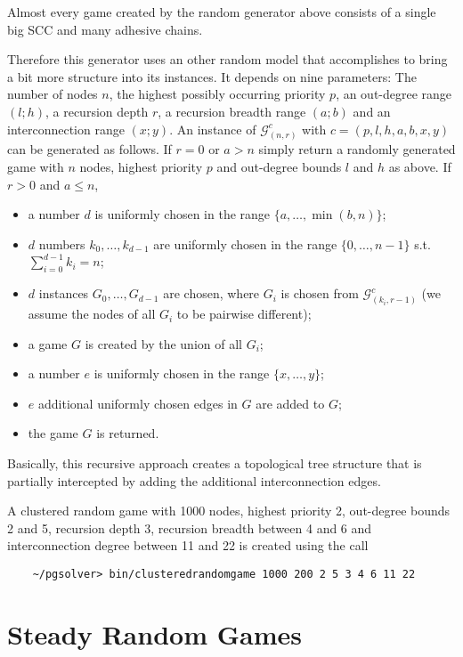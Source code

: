 Almost every game created by the random generator above consists of a single big SCC and many adhesive
chains.

Therefore this generator uses an other random model that accomplishes to bring a bit more structure into its instances. It depends on nine parameters: The number of nodes $n$, the highest possibly occurring priority $p$, an out-degree range $(l;h)$, a recursion depth $r$, a recursion breadth range $(a;b)$ and an interconnection range $(x;y)$. An instance of $\mathcal{G}^c_{(n,r)}$ with $c = (p,l,h,a,b,x,y)$ can be generated as follows. If $r = 0$ or $a > n$ simply return a randomly generated game with $n$ nodes, highest priority $p$ and out-degree bounds $l$ and $h$ as above. If $r > 0$ and $a \leq n$,
\begin{itemize}
\item a number $d$ is uniformly chosen in the range $\{a,\ldots,\min(b,n)\}$;
\item $d$ numbers $k_0,\ldots,k_{d-1}$ are uniformly chosen in the range $\{0,\ldots,n-1\}$ s.t.\ $\sum_{i=0}^{d-1} k_i = n$;
\item $d$ instances $G_0,\ldots,G_{d-1}$ are chosen, where $G_i$ is chosen from $\mathcal{G}^c_{(k_i,r-1)}$ (we assume the nodes of all $G_i$ to be pairwise different);
\item a game $G$ is created by the union of all $G_i$;
\item a number $e$ is uniformly chosen in the range $\{x,\ldots,y\}$;
\item $e$ additional uniformly chosen edges in $G$ are added to $G$;
\item the game $G$ is returned.
\end{itemize}

Basically, this recursive approach creates a topological tree structure that is partially intercepted by adding the additional interconnection edges.

A clustered random game with 1000 nodes, highest priority 2, out-degree bounds 2 and 5, recursion depth 3, recursion breadth between 4 and 6 and interconnection degree between 11 and 22 is created using the call
\begin{verbatim}
    ~/pgsolver> bin/clusteredrandomgame 1000 200 2 5 3 4 6 11 22
\end{verbatim}


\section{Steady Random Games}

